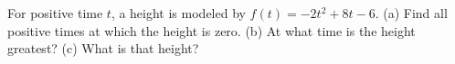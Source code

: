 For positive time $t$, a height is modeled by $f(t)=-2t^2+8t-6$. (a) Find all positive times at which the height is zero. (b) At what time is the height greatest? (c) What is that height?
